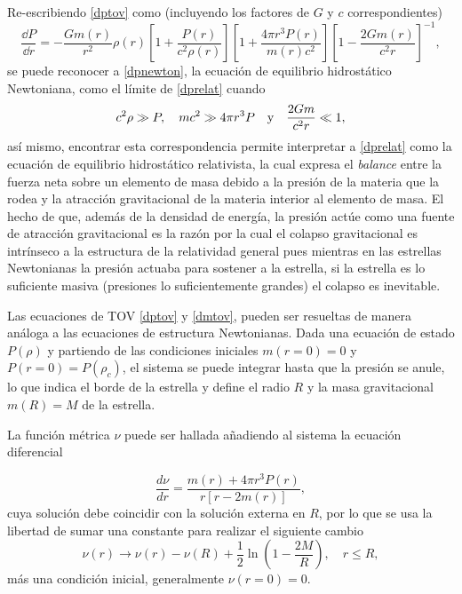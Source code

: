 Re-escribiendo \eqref{dptov} como (incluyendo los factores de $G$ y $c$ correspondientes)
\begin{equation}
    \frac { \dd P } { \dd r } =  - \frac { G  m ( r ) } { r ^ { 2 } } \rho ( r ) \left[ 1 + \frac { P ( r ) } {c ^ { 2 } \rho ( r ) } \right] \left[ 1 + \frac { 4 \pi r ^ { 3 } P ( r ) } { m ( r ) c ^ { 2 } } \right]  \left[ 1 - \frac { 2 G m ( r ) } { c ^ { 2 } r } \right] ^ { - 1 }, 
    \label{dprelat}
\end{equation}
se puede reconocer a \eqref{dpnewton}, la ecuación de equilibrio hidrostático Newtoniana, como el límite de \eqref{dprelat} cuando 
\begin{equation}
    c^2\rho \gg P \qc mc^2 \gg 4\pi r^3P \quad \text{y} \quad  \frac{2Gm}{c^2r}\ll 1,
\end{equation}
así mismo, encontrar esta correspondencia permite interpretar a \eqref{dprelat} como la ecuación de equilibrio hidrostático relativista, la cual expresa el \textit{balance} entre la fuerza neta sobre un elemento de masa debido a la presión de la materia que la rodea y la atracción gravitacional de la materia interior al elemento de masa. El hecho de que, además de la densidad de energía, la presión actúe como una fuente de atracción gravitacional es la razón por la cual el colapso gravitacional es intrínseco a la estructura de la relatividad general pues mientras en las estrellas Newtonianas la presión actuaba para sostener a la estrella, si la estrella es lo suficiente masiva (presiones lo suficientemente grandes) el colapso es inevitable.

Las ecuaciones de TOV \eqref{dptov} y \eqref{dmtov}, pueden ser resueltas de manera análoga a las ecuaciones de estructura Newtonianas. Dada una ecuación de estado $P(\rho)$ y partiendo de las condiciones iniciales $m(r=0)=0$ y $P(r=0)=P(\rho_c)$, el sistema se puede integrar hasta que la presión se anule, lo que indica el borde de la estrella y define el radio $R$ y la masa gravitacional $m(R)=M$ de la estrella. 

La función métrica $\nu$ puede ser hallada añadiendo al sistema la ecuación diferencial

\begin{equation}
    \frac { d \nu } { d r } = \frac { m ( r ) + 4 \pi r ^ { 3 } P ( r ) } { r [ r - 2 m ( r ) ] },
\end{equation}
cuya solución debe coincidir con la solución externa en $R$, por lo que se usa la libertad de sumar una constante para realizar el siguiente cambio
\begin{equation}
    \nu ( r ) \longrightarrow \nu ( r ) - \nu ( R ) + \frac { 1 } { 2 } \ln \left( 1 - \frac { 2 M } { R } \right) , \quad r \leq R,
\end{equation}
más una condición inicial, generalmente $\nu(r=0)=0$.




